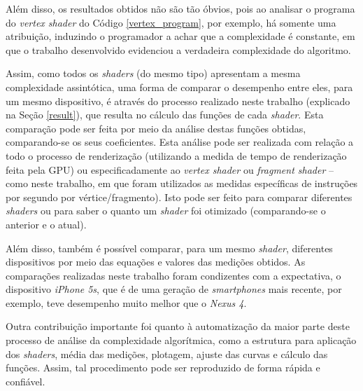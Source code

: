 	Além disso, os resultados obtidos não são tão óbvios, pois ao analisar o programa do \textit{vertex shader} do Código \ref{vertex_program}, por exemplo, há somente uma atribuição, induzindo o programador  a achar que a complexidade é constante, em que o trabalho desenvolvido evidenciou a verdadeira complexidade do algoritmo.

	 
	
	Assim, como todos os \textit{shaders} (do mesmo tipo) apresentam a mesma complexidade assintótica, uma forma de comparar o desempenho entre eles, para um mesmo dispositivo, é através do processo realizado neste trabalho (explicado na Seção \ref{result}), que resulta no cálculo das funções de cada \textit{shader}. Esta comparação pode ser feita por meio da análise destas funções obtidas, comparando-se os seus coeficientes. Esta análise pode ser realizada com relação a todo o processo de renderização (utilizando a medida de tempo de renderização feita pela GPU) ou especificadamente ao \textit{vertex shader} ou \textit{fragment shader} -- como neste trabalho, em que foram utilizados as medidas específicas de instruções por segundo por vértice/fragmento).  Isto pode ser feito para comparar diferentes \textit{shaders} ou para saber o quanto um \textit{shader} foi otimizado (comparando-se o anterior e o atual). 

	Além disso, também é possível comparar, para um mesmo \textit{shader}, diferentes dispositivos por meio das equações e valores das medições obtidos. As comparações realizadas neste trabalho foram condizentes com a expectativa, o dispositivo \textit{iPhone 5s},  que é de uma geração de \textit{smartphones} mais recente, por exemplo, teve desempenho muito melhor que o \textit{Nexus 4}.   	

	Outra contribuição importante foi quanto à automatização da maior parte deste processo de análise da complexidade algorítmica, como a estrutura para aplicação dos \textit{shaders}, média das medições, plotagem, ajuste das curvas e cálculo das funções. Assim, tal procedimento pode ser reproduzido de forma rápida e confiável. 
